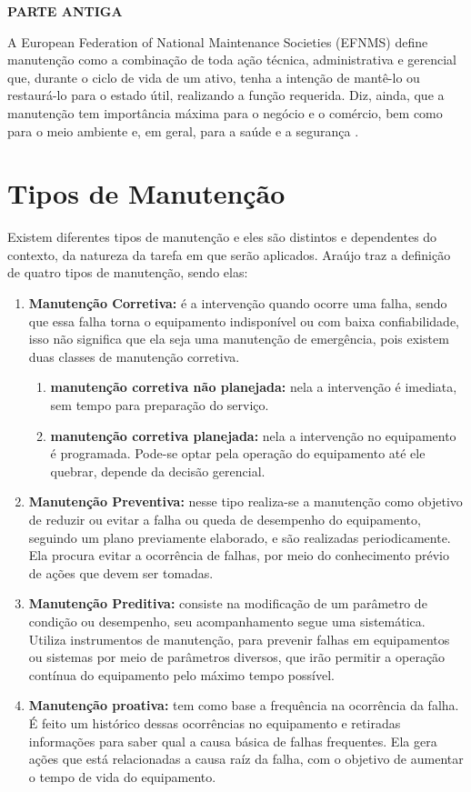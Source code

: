 \textbf{PARTE ANTIGA}


A European Federation of National Maintenance Societies (EFNMS) define manutenção como a combinação de toda ação técnica, administrativa e gerencial que, durante o ciclo de vida de um ativo, tenha a intenção de mantê-lo ou restaurá-lo para o estado útil, realizando a função requerida. Diz, ainda, que a manutenção tem importância máxima para o negócio e o comércio, bem como para o meio ambiente e, em geral, para a saúde e a segurança \cite{efnms}.

\section{Tipos de Manutenção}

Existem diferentes tipos de manutenção e eles são distintos e dependentes do contexto, da natureza da tarefa em que serão aplicados. Araújo \cite{araujo2015} traz a definição de quatro tipos de manutenção, sendo elas:

\begin{enumerate}
	\item \textbf{Manutenção Corretiva:} é a intervenção quando ocorre uma falha, sendo que essa falha torna o equipamento indisponível ou com baixa confiabilidade, isso não significa que ela seja uma manutenção de emergência, pois existem duas classes de manutenção corretiva.
		\begin{enumerate}
			\item \textbf{manutenção corretiva não planejada:} nela a intervenção é imediata, sem tempo para preparação do serviço.
			\item \textbf{manutenção corretiva planejada:} nela a intervenção no equipamento é programada. Pode-se optar pela operação do equipamento até ele quebrar, depende da decisão gerencial.
		\end{enumerate}
	\item \textbf{Manutenção Preventiva:} nesse tipo realiza-se a manutenção como objetivo de reduzir ou evitar a falha ou queda de desempenho do equipamento, seguindo um plano previamente elaborado, e são realizadas periodicamente. Ela procura evitar a ocorrência de falhas, por meio do conhecimento prévio de ações que devem ser tomadas.
	\item \textbf{Manutenção Preditiva:} consiste na modificação de um parâmetro de condição ou desempenho, seu acompanhamento segue uma sistemática. Utiliza instrumentos de manutenção, para prevenir falhas em equipamentos ou sistemas por meio de parâmetros diversos, que irão permitir a operação contínua do equipamento pelo máximo tempo possível.
	\item \textbf{Manutenção proativa:} tem como base a frequência na ocorrência da falha. É feito um histórico dessas ocorrências no equipamento e retiradas informações para saber qual a causa básica de falhas frequentes. Ela gera ações que está relacionadas a causa raíz da falha, com o objetivo de aumentar o tempo de vida do equipamento.
\end{enumerate}


